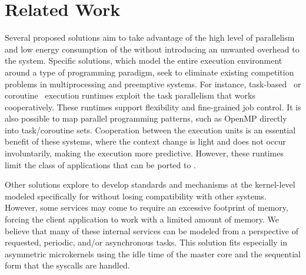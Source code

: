 \section{Related Work}
\label{sec:related-work}

	Several proposed solutions aim to take advantage of the high level of
	parallelism and low energy consumption of the \lws without introducing an
	unwanted overhead to the system.
	Specific solutions, which model the entire execution environment around
	a type of programming paradigm, seek to eliminate existing competition problems
	in multiprocessing and preemptive systems. For instance,
	task-based~\cite{Zhou:coroutine} or coroutine~\cite{Cesarini:task} execution
	runtimes exploit the task parallelism that works cooperatively. These runtimes
	support flexibility and fine-grained job control.  It is also possible to map
	parallel programming patterns, such as OpenMP directly into task/coroutine
	sets. Cooperation between the execution units is an essential benefit of these
	systems, where the context change is light and does not occur involuntarily,
	making the execution more predictive. However, these runtimes limit the class
	of applications that can be ported to \lws.

	Other solutions explore to develop standards and mechanisms at the
	kernel-level~\cite{Penna:Microkernel} modeled specifically for \lws without
	losing compatibility with other systems. However, some \os services may come to
	require an excessive footprint of memory, forcing the client application to
	work with a limited amount of memory.
	We believe that many of these internal \os services can be modeled from
	a perspective of requested, periodic, and/or asynchronous tasks. This solution
	fits especially in asymmetric microkernels using the idle time of the master
	core and the sequential form that the syscalls are handled.

